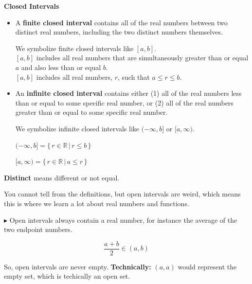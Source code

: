 \documentclass{ximera}
\begin{document}
\begin{definition}  \textbf{\textcolor{green!50!black}{Closed Intervals}} 



\begin{itemize}
\item A \textbf{finite closed interval} contains all of the real numbers between two distinct real numbers, including the two distinct numbers themselves.

We symbolize finite closed intervals like $[a, b]$. \\
$[a,b]$ includes all real numbers that are simultaneously greater than or equal $a$ and also less than or equal $b$.  \\
$[a,b]$ includes all real numbers, $r$, such that $a \leq r \leq b$.



\item An \textbf{infinite closed interval} contains either (1) all of the real numbers less than or equal to some specific real number, or (2) all of the real numbers greater than or equal to some specific real number.

We symbolize infinite closed intervals like $(-\infty, b]$ or $[a, \infty)$.


$(-\infty, b] = \{ \, r \in \mathbb{R} \, | \,  r \leq b  \,   \}$

$[a, \infty) = \{ \, r \in \mathbb{R} \, | \,  a \leq r   \,  \}$

\end{itemize}


\end{definition}
\textbf{Distinct} means different or not equal. 









You cannot tell from the definitions, but open intervals are weird, which means this is where we learn a lot about real numbers and functions. 


$\blacktriangleright$  Open intervals always contain a real number, for instance the average of the two endpoint numbers.



\[  \frac{a+b}{2}  \in (a,b)    \]



So, open intervals are never empty. 
\textbf{Technically:}  $(a,a)$ would represent the empty set, which is techically an open set. 
\end{document}

